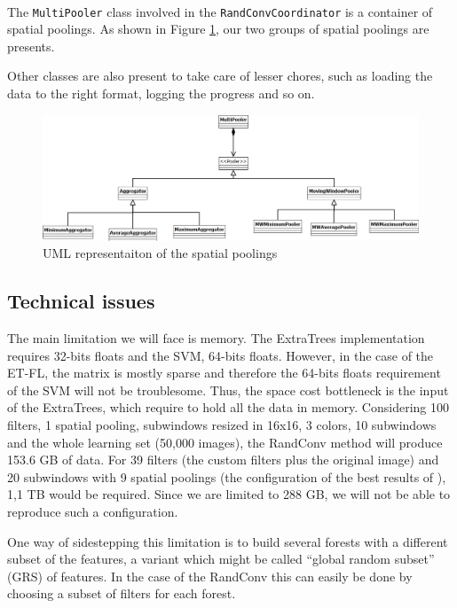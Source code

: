 \documentclass[a4paper]{report}
\begin{document}
		
		\paragraph{}
		The \texttt{MultiPooler} class involved in the \texttt{RandConvCoordinator} is a container of spatial poolings. As shown in Figure \ref{fig:uml-pooling}, our two groups of spatial poolings are presents.
		\par
		Other classes are also present to take care of lesser chores, such as loading the data to the right format, logging the progress and so on.
		
		
		\begin{figure}
			\centering
				\includegraphics[width=1.00\textwidth]{images/uml-pooling.png}
			\caption{UML representaiton of the spatial poolings}
			\label{fig:uml-pooling}
		\end{figure}
			
		
		\subsection{\label{sub:TechnicalIssues}Technical issues}
		The main limitation we will face is memory. The ExtraTrees implementation requires 32-bits floats and the SVM, 64-bits floats. However, in the case of the ET-FL, the matrix is mostly sparse and therefore the 64-bits floats requirement of the SVM will not be troublesome. Thus, the space cost bottleneck is the input of the ExtraTrees, which require to hold all the data in memory. Considering 100 filters, 1 spatial pooling, subwindows resized in 16x16, 3 colors, 10 subwindows and the whole learning set (50,000 images), the RandConv method will produce 153.6 GB of data. For 39 filters (the custom filters plus the original image) and 20 subwindows with 9 spatial poolings (the configuration of the best results of \cite{base}), 1,1 TB would be required. Since we are limited to 288 GB, we will not be able to reproduce such a configuration.
		\par
		One way of sidestepping this limitation is to build several forests with a different subset of the features, a variant which might be called ``global random subset'' (GRS) of features. 
		In the case of the RandConv this can easily be done by choosing a subset of filters for each forest.
		
\end{document}
